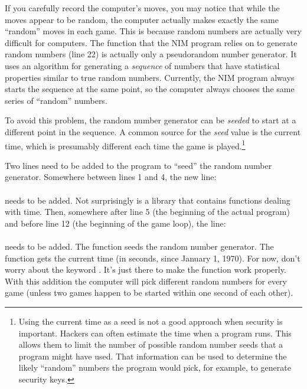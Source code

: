 
If you carefully record the computer's moves, you may notice that while the moves appear to be random, the computer actually makes exactly the same ``random'' moves in each game.  This is because random numbers are actually very difficult for computers.  The  function that the NIM program relies on to generate random numbers (line 22) is actually only a pseudorandom number generator.  It uses an algorithm for generating a \emph{sequence} of numbers that have statistical properties similar to true random numbers.  Currently, the NIM program always starts the sequence at the same point, so the computer always chooses the same series of ``random'' numbers. 

To avoid this problem, the random number generator can be \emph{seeded} to start at a different point in the sequence.  A common source for the \emph{seed} value is the current time, which is presumably different each time the game is played.\footnote{Using the current time as a seed is not a good approach when security is important.  Hackers can often estimate the time when a program runs.  This allows them to limit the number of possible random number seeds that a program might have used.   That information can be used to determine the likely ``random'' numbers the program would pick, for example, to generate security keys.}  

Two lines need to be added to the program to ``seed'' the random number generator.  Somewhere between lines 1 and 4, the new line:\\
\\
needs to be added.  Not surprisingly 
 is a library that contains functions dealing with time.  Then, somewhere after line 5 (the beginning of the actual program) and before line 12 (the beginning of the game loop), the line:\\
\\
needs to be added.  The function  seeds the random number generator.  The function  gets the current time (in seconds, since January 1, 1970).  For now, don't worry about the keyword .  It's just there to make the  function work properly.  With this addition the computer will pick different random numbers for every game (unless two games happen to be started within one second of each other).


